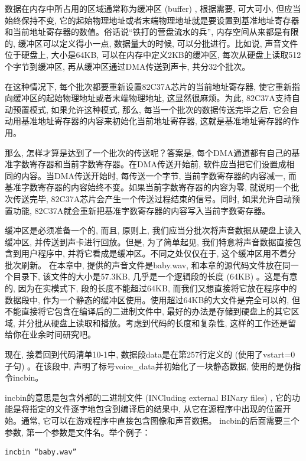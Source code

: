 \documentclass[12pt]{article}
\begin{document}
\begin{CJK}{UTF8}{gbsn}
数据在内存中所占用的区域通常称为缓冲区 (buffer) , 根据需要, 可大可小, 但应当始终保持不变, 它的起始物理地址或者末端物理地址就是要设置到基准地址寄存器和当前地址寄存器的数值。俗话说“铁打的营盘流水的兵”, 内存空间从来都是有限的, 缓冲区可以定义得小一点, 数据量大的时候, 可以分批进行。比如说, 声音文件位于硬盘上, 大小是64KB, 可以在内存中定义2KB的缓冲区, 每次从硬盘上读取512个字节到缓冲区, 再从缓冲区通过DMA传送到声卡, 共分32个批次。

在这种情况下, 每个批次都要重新设置82C37A芯片的当前地址寄存器, 使它重新指向缓冲区的起始物理地址或者末端物理地址, 这显然很麻烦。为此, 82C37A支持自动预置模式, 如果允许这种模式, 那么, 每当一个批次的数据传送完毕之后, 它会自动用基准地址寄存器的内容来初始化当前地址寄存器, 这就是基准地址寄存器的作用。

那么, 怎样才算是达到了一个批次的传送呢？答案是, 每个DMA通道都有自己的基准字数寄存器和当前字数寄存器。在DMA传送开始前, 软件应当把它们设置成相同的内容。当DMA传送开始时, 每传送一个字节, 当前字数寄存器的内容减一, 而基准字数寄存器的内容始终不变。如果当前字数寄存器的内容为零, 就说明一个批次传送完毕, 82C37A芯片会产生一个传送过程结束的信号。同时, 如果允许自动预置功能, 82C37A就会重新把基准字数寄存器的内容写入当前字数寄存器。

缓冲区是必须准备一个的, 而且, 原则上, 我们应当分批次将声音数据从硬盘上读入缓冲区, 并传送到声卡进行回放。但是, 为了简单起见, 我们特意将声音数据直接包含到用户程序中, 并将它看成是缓冲区。不同之处仅仅在于, 这个缓冲区用不着分批次刷新。
在本章中, 提供的声音文件是baby.wav, 和本章的源代码文件放在同一个目录下, 该文件的大小是57.3KB, 几乎是一个逻辑段的长度 (64KB) 。这是有意的, 因为在实模式下, 段的长度不能超过64KB, 而我们又想直接将它放在程序中的数据段中, 作为一个静态的缓冲区使用。使用超过64KB的大文件是完全可以的, 但不能直接将它包含在编译后的二进制文件中, 最好的办法是存储到硬盘上的其它区域, 并分批从硬盘上读取和播放。考虑到代码的长度和复杂性, 这样的工作还是留给你在业余时间研究吧。

现在, 接着回到代码清单10-1中, 数据段data是在第257行定义的 (使用了vstart=0子句) 。在该段中, 声明了标号voice\_{}data并初始化了一块静态数据, 使用的是伪指令incbin。

incbin的意思是包含外部的二进制文件 (INCluding external BINary files) , 它的功能是将指定的文件逐字地包含到编译后的结果中, 从它在源程序中出现的位置开始。通常, 它可以在游戏程序中直接包含图像和声音数据。
incbin的后面需要三个参数, 第一个参数是文件名。举个例子：

\begin{verbatim}
incbin “baby.wav”
\end{verbatim}


\end{CJK}
\end{document}
